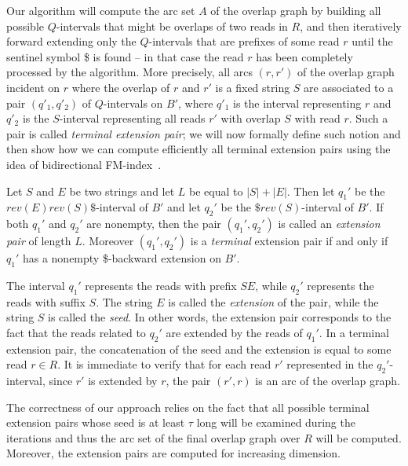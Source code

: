 \documentclass[runningheads,envcountsame,a4paper]{llncs}
\begin{document}
Our algorithm  will compute the arc set $A$  of the overlap graph
by building all possible $Q$-intervals that might be overlaps of two
reads in $R$, and then iteratively forward extending only the $Q$-intervals that
are prefixes of some read $r$ until the sentinel symbol \$ is
found -- in that case the read $r$ has been completely processed by the algorithm.
More precisely,    all arcs    $(r,r')$ of the overlap graph incident on $r$ where the overlap of $r$ and $r'$ is a fixed string $S$ are  associated to a pair  $(q'_1, q'_2)$ of $Q$-intervals on $B'$,
where $q'_1$ is the interval  representing   $r$ and $q'_2$ is the  $S$-interval representing all reads
 $r'$ with overlap $S$ with read $r$. Such a pair is called {\em terminal
extension pair}; we will now  formally define such notion and then show how we
can compute efficiently all terminal extension pairs
using the idea of bidirectional FM-index~\cite{Lam2009}.

\begin{definition}\label{def:extension-pair}
Let $S$ and $E$ be two strings and let $L$ be equal to $|S|+|E|$.
Then let $q_{1}'$ be the $rev(E)rev(S)\$$-interval of $B'$ and let  $q_{2}'$ be the $\$rev(S)$-interval of $B'$.
If both $q_{1}'$ and  $q_{2}'$ are nonempty, then the pair  $(q_{1}', q_{2}')$ is called
an \emph{extension pair} of length $L$.
Moreover $(q_{1}', q_{2}')$ is a \emph{terminal} extension pair
if and only if $q_{1}'$ has a nonempty \$-backward extension on $B'$.
\end{definition}

The interval $q_{1}'$ represents   the reads with prefix $SE$, while $q_{2}'$
represents the reads with suffix $S$.
The  string $E$ is called the \emph{extension} of the
pair, while the string $S$ is called the \emph{seed}.
In other words, the extension pair corresponds to the fact that the reads related to $q_{2}'$ are extended by the reads
of $q_{1}'$.
In a terminal extension pair, the concatenation of the seed and the extension is
equal to some read $r \in R$.
It is immediate to verify  that for each read $r'$ represented in the $q_{2}'$-interval, since $r'$ is extended by $r$,
the pair $(r', r)$ is an arc of the overlap graph.


The correctness of our approach relies on the fact that all possible
terminal extension pairs whose seed is at least $\tau$ long will be examined during the iterations and thus
the arc set of the final overlap  graph over $R$ will be computed.
Moreover, the extension pairs are computed for increasing dimension.
\end{document}
